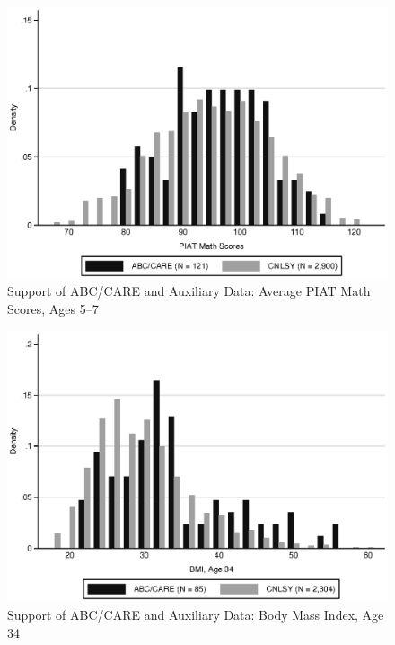 \documentclass[static]{JJH-Beamer}
\begin{document}
\begin{frame}

\begin{figure}[H]\addtocounter{figure}{-1}
\caption{Support of ABC/CARE and Auxiliary Data: Average PIAT Math Scores, Ages 5--7} \label{fig:support_math}
\begin{center}
\includegraphics[width=.75\textwidth]{AppOutput/Methodology/support_math.eps}
\end{center}
\end{figure}

\end{frame}

\begin{frame}
	
\begin{figure}[H]\addtocounter{figure}{-1}
\caption{Support of ABC/CARE and Auxiliary Data: Body Mass Index, Age 34} \label{fig:support_bmi}
\begin{center}
\includegraphics[width=.75\textwidth]{AppOutput/Methodology/support_bmi.eps}
\end{center}
\end{figure}

\end{frame}
\end{document}
